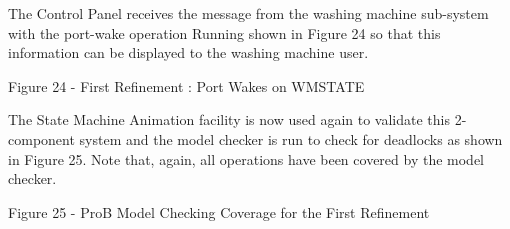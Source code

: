 The Control Panel receives the message from the washing machine sub-system with the port-wake operation Running shown in Figure 24 so that this information can be displayed to the washing machine user.
 
Figure 24 - First Refinement : Port Wakes on WMSTATE

The State Machine Animation facility is now used again to validate this 2-component system and the model checker is run to check for deadlocks as shown in Figure 25. Note that, again, all operations have been covered by the model checker.
 
Figure 25 - ProB Model Checking Coverage for the First Refinement



